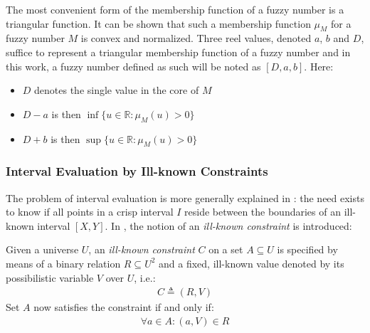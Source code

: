 %  

The most convenient form of the membership function of a fuzzy number is a triangular function. It can be shown that such a membership function $\mu_M$ for a fuzzy number $M$ is convex and normalized. Three reel values, denoted $a$, $b$ and $D$, suffice to represent a triangular membership function of a fuzzy number and in this work, a fuzzy number defined as such will be noted as $\left[D, a, b \right]$. Here:
\begin{itemize}
\item
$D$ denotes the single value in the core of $M$
\item
$D-a$ is then $\inf \{u \in \mathbb{R} : \mu_{M}(u) > 0\}$
\item
$D+b$ is then $\sup \{u \in \mathbb{R} : \mu_{M}(u) > 0\}$
\end{itemize}
%  



\subsubsection{Interval Evaluation by Ill-known Constraints}
The problem of interval evaluation is more generally explained in \cite{Pon11}: the need exists to know if all points in a crisp interval $I$ reside between the boundaries of an ill-known interval $\left[ X , Y \right]$. In \cite{Pon11}, the notion of an \emph{ill-known constraint} is introduced:

\begin{definition}
Given a universe $U$, an \emph{ill-known constraint} $C$ on a set $A \subseteq U$ is specified by means of a binary relation $R \subseteq U^{2}$ and a fixed, ill-known value denoted by its possibilistic variable $V$ over $U$, i.e.:
\begin{align}
C \triangleq (R,V)
\end{align}
Set $A$ now satisfies the constraint if and only if:
\begin{align}
\forall a \in A : (a,V) \in R
\end{align}
\end{definition}

